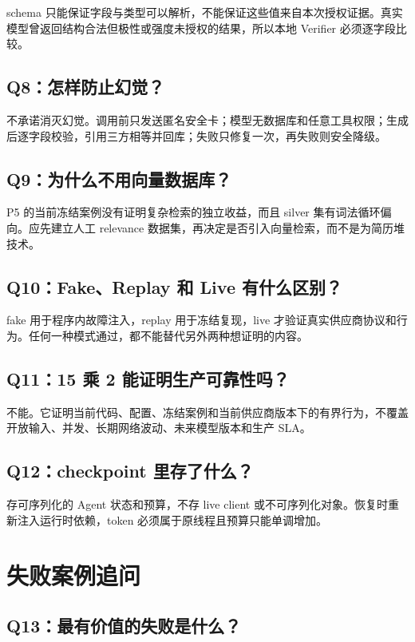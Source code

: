 schema 只能保证字段与类型可以解析，不能保证这些值来自本次授权证据。真实模型曾返回结构合法但极性或强度未授权的结果，所以本地 Verifier 必须逐字段比较。

\subsection{Q8：怎样防止幻觉？}

不承诺消灭幻觉。调用前只发送匿名安全卡；模型无数据库和任意工具权限；生成后逐字段校验，引用三方相等并回库；失败只修复一次，再失败则安全降级。

\subsection{Q9：为什么不用向量数据库？}

P5 的当前冻结案例没有证明复杂检索的独立收益，而且 silver 集有词法循环偏向。应先建立人工 relevance 数据集，再决定是否引入向量检索，而不是为简历堆技术。

\subsection{Q10：Fake、Replay 和 Live 有什么区别？}

fake 用于程序内故障注入，replay 用于冻结复现，live 才验证真实供应商协议和行为。任何一种模式通过，都不能替代另外两种想证明的内容。

\subsection{Q11：15 乘 2 能证明生产可靠性吗？}

不能。它证明当前代码、配置、冻结案例和当前供应商版本下的有界行为，不覆盖开放输入、并发、长期网络波动、未来模型版本和生产 SLA。

\subsection{Q12：checkpoint 里存了什么？}

存可序列化的 Agent 状态和预算，不存 live client 或不可序列化对象。恢复时重新注入运行时依赖，token 必须属于原线程且预算只能单调增加。

\section{失败案例追问}

\subsection{Q13：最有价值的失败是什么？}

